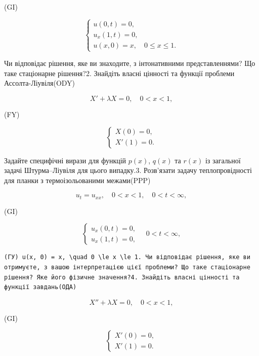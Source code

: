 \documentclass[
  ukrainian,
]{article}
\begin{document}
(GI)

\[
\begin{cases} u(0, t) = 0, \\ u_x(1, t) = 0, \\ u(x, 0) = x, \quad 0 \le x \le 1. \end{cases}
\]

Чи відповідає рішення, яке ви знаходите, з інтонативними
представленнями? Що таке стаціонарне рішення?2. Знайдіть власні цінності
та функції проблеми Ассолта-Ліувіля(ODY)

\[
X' + \lambda X = 0, \quad 0 < x < 1,
\]

(FY)

\[
\begin{cases} X(0) = 0, \\ X'(1) = 0. \end{cases}
\]

Задайте специфічні вирази для функцій \(p(x)\), \(q(x)\) та \(r(x)\) із
загальної задачі Штурма--Ліувіля для цього випадку.3. Розв'язати задачу
теплопровідності для планки з термоізольованими межами(PPP)

\[
u_t = u_{xx}, \quad 0 < x < 1, \quad 0 < t < \infty,
\]

(GI)

\[
\begin{cases} u_x (0, t) = 0, \\ u_x (1, t) = 0, \end{cases} \quad 0 < t < \infty,
\]

\begin{verbatim}
(ГУ) u(x, 0) = x, \quad 0 \le x \le 1. Чи відповідає рішення, яке ви отримуєте, з вашою інтерпретацією цієї проблеми? Що таке стаціонарне рішення? Яке його фізичне значення?4. Знайдіть власні цінності та функції завдань(ОДА)
\end{verbatim}

\[
X'' + \lambda X = 0, \quad 0 < x < 1,
\]

(GI)

\[
\begin{cases} X'(0) = 0, \\ X'(1) = 0. \end{cases}
\]
\end{document}
